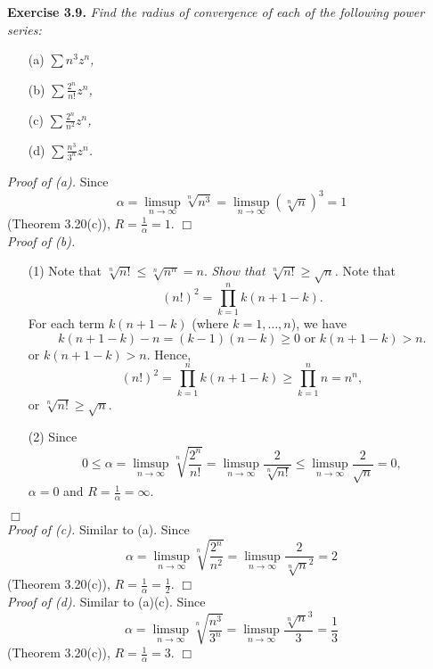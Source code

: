 \documentclass{article}
\begin{document}



\textbf{Exercise 3.9.}
\emph{Find the radius of convergence of each of the following power series:}
\begin{enumerate}
\item[(a)]
\emph{$\sum n^3 z^n$,}
\item[(b)]
\emph{$\sum \frac{2^n}{n!} z^n$,}
\item[(c)]
\emph{$\sum \frac{2^n}{n^2} z^n$,}
\item[(d)]
\emph{$\sum \frac{n^3}{3^n} z^n$.} \\
\end{enumerate}

\emph{Proof of (a).}
Since
$$\alpha
= \limsup_{n \to \infty} \sqrt[n]{n^3}
= \limsup_{n \to \infty} (\sqrt[n]{n})^3
= 1$$ (Theorem 3.20(c)),
$R = \frac{1}{\alpha} = 1$.
$\Box$ \\

\emph{Proof of (b).}
\begin{enumerate}
\item[(1)]
Note that
$\sqrt[n]{n!} \leq \sqrt[n]{n^n} = n$.
\emph{Show that $\sqrt[n]{n!} \geq \sqrt{n}$.}
Note that
$$(n!)^2 = \prod_{k=1}^{n} k(n+1-k).$$
For each term $k(n+1-k)$ (where $k=1,\ldots,n$),
we have $$k(n+1-k) - n = (k-1)(n-k) \geq 0 \text{ or } k(n+1-k) > n.$$
or $k(n+1-k) > n$.
Hence,
$$(n!)^2 = \prod_{k=1}^{n} k(n+1-k) \geq \prod_{k=1}^{n} n = n^n,$$
or $\sqrt[n]{n!} \geq \sqrt{n}$.
\item[(2)]
Since
$$0 \leq \alpha
= \limsup_{n \to \infty} \sqrt[n]{\frac{2^n}{n!}}
= \limsup_{n \to \infty} \frac{2}{\sqrt[n]{n!}}
\leq \limsup_{n \to \infty} \frac{2}{\sqrt{n}}
= 0,$$
$\alpha = 0$ and
$R = \frac{1}{\alpha} = \infty$.
\end{enumerate}
$\Box$ \\

\emph{Proof of (c).}
Similar to (a).
Since
$$\alpha
= \limsup_{n \to \infty} \sqrt[n]{\frac{2^n}{n^2}}
= \limsup_{n \to \infty} \frac{2}{\sqrt[n]{n}^2}
= 2$$ (Theorem 3.20(c)),
$R = \frac{1}{\alpha} = \frac{1}{2}$.
$\Box$ \\

\emph{Proof of (d).}
Similar to (a)(c).
Since
$$\alpha
= \limsup_{n \to \infty} \sqrt[n]{\frac{n^3}{3^n}}
= \limsup_{n \to \infty} \frac{\sqrt[n]{n}^3}{3}
= \frac{1}{3}$$ (Theorem 3.20(c)),
$R = \frac{1}{\alpha} = 3$.
$\Box$ \\\\
\end{document}
